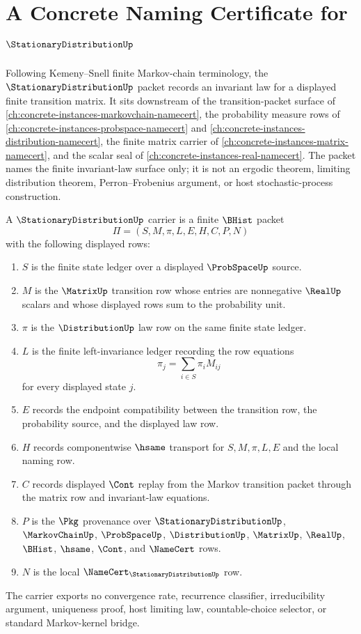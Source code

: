 \chapter{A Concrete Naming Certificate for $\StationaryDistributionUp$}
\label{ch:concrete-instances-stationary-distribution-namecert}

Following Kemeny--Snell finite Markov-chain terminology, the
$\StationaryDistributionUp$ packet records an invariant law for a displayed
finite transition matrix. It sits downstream of the transition-packet surface
of \autoref{ch:concrete-instances-markovchain-namecert}, the probability
measure rows of \autoref{ch:concrete-instances-probspace-namecert} and
\autoref{ch:concrete-instances-distribution-namecert}, the finite matrix
carrier of \autoref{ch:concrete-instances-matrix-namecert}, and the scalar
seal of \autoref{ch:concrete-instances-real-namecert}. The packet names the
finite invariant-law surface only; it is not an ergodic theorem, limiting
distribution theorem, Perron--Frobenius argument, or host stochastic-process
construction.

\begin{definition}
\label{def:stationary-distribution-carrier}
A $\StationaryDistributionUp$ carrier is a finite $\BHist$ packet
$$
\Pi=(S,M,\pi,L,E,H,C,P,N)
$$
with the following displayed rows:
\begin{enumerate}
\item $S$ is the finite state ledger over a displayed $\ProbSpaceUp$ source.
\item $M$ is the $\MatrixUp$ transition row whose entries are nonnegative
$\RealUp$ scalars and whose displayed rows sum to the probability unit.
\item $\pi$ is the $\DistributionUp$ law row on the same finite state ledger.
\item $L$ is the finite left-invariance ledger recording the row equations
$$
\pi_j=\sum_{i\in S}\pi_i M_{ij}
$$
for every displayed state $j$.
\item $E$ records the endpoint compatibility between the transition row, the
probability source, and the displayed law row.
\item $H$ records componentwise $\hsame$ transport for $S,M,\pi,L,E$ and the
local naming row.
\item $C$ records displayed $\Cont$ replay from the Markov transition packet
through the matrix row and invariant-law equations.
\item $P$ is the $\Pkg$ provenance over $\StationaryDistributionUp$,
$\MarkovChainUp$, $\ProbSpaceUp$, $\DistributionUp$, $\MatrixUp$, $\RealUp$,
$\BHist$, $\hsame$, $\Cont$, and $\NameCert$ rows.
\item $N$ is the local $\NameCert_{\StationaryDistributionUp}$ row.
\end{enumerate}
The carrier exports no convergence rate, recurrence classifier, irreducibility
argument, uniqueness proof, host limiting law, countable-choice selector, or
standard Markov-kernel bridge.
\end{definition}

